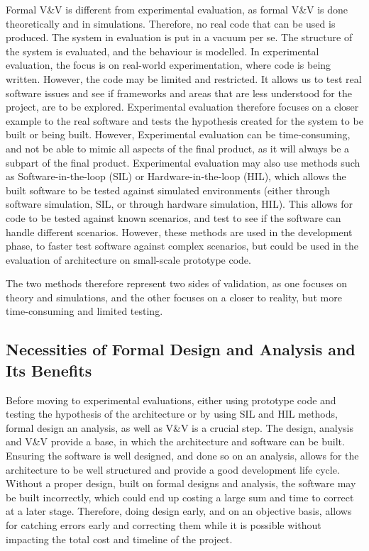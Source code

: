Formal V\&V is different from experimental evaluation, as formal V\&V is done theoretically and in simulations. Therefore, no real code that can be used is produced. The system in evaluation is put in a vacuum per se. The structure of the system is evaluated, and the behaviour is modelled.
In experimental evaluation, the focus is on real-world experimentation, where code is being written. However, the code may be limited and restricted. It allows us to test real software issues and see if frameworks and areas that are less understood for the project, are to be explored.
Experimental evaluation therefore focuses on a closer example to the real software and tests the hypothesis created for the system to be built or being built. However, Experimental evaluation can be time-consuming, and not be able to mimic all aspects of the final product, as it will always be a subpart of the final product.
Experimental evaluation may also use methods such as Software-in-the-loop (SIL) or Hardware-in-the-loop (HIL), which allows the built software to be tested against simulated environments (either through software simulation, SIL, or through hardware simulation, HIL). This allows for code to be tested against known scenarios, and test to see if the software can handle different scenarios. However, these methods are used in the development phase, to faster test software against complex scenarios, but could be used in the evaluation of architecture on small-scale prototype code.

The two methods therefore represent two sides of validation, as one focuses on theory and simulations, and the other focuses on a closer to reality, but more time-consuming and limited testing.

\subsection{Necessities of Formal Design and Analysis and Its Benefits}

Before moving to experimental evaluations, either using prototype code and testing the hypothesis of the architecture or by using SIL and HIL methods, formal design an analysis, as well as V\&V is a crucial step. 
The design, analysis and V\&V provide a base, in which the architecture and software can be built. Ensuring the software is well designed, and done so on an analysis, allows for the architecture to be well structured and provide a good development life cycle. Without a proper design, built on formal designs and analysis, the software may be built incorrectly, which could end up costing a large sum and time to correct at a later stage. 
Therefore, doing design early, and on an objective basis, allows for catching errors early and correcting them while it is possible without impacting the total cost and timeline of the project.


